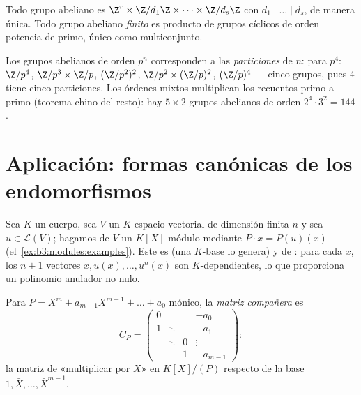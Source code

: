 \begin{corollary}
\label{cor:b3:modules:abelian}
Todo grupo abeliano 
es $\Z^r \times
\Z/d_1\Z\times\dots\times\Z/d_s\Z$ con $d_1 \mid \dots \mid
d_s$, de manera única. Todo grupo abeliano \emph{finito} es producto de
grupos cíclicos de orden potencia de primo, único como
multiconjunto.
\end{corollary}

\begin{example}\label{ex:b3:modules:abelian}
Los grupos abelianos de orden $p^n$ corresponden a las
\emph{particiones} de $n$: para $p^4$: $\Z/p^4$, $\Z/p^3\times\Z/p$,
$(\Z/p^2)^2$, $\Z/p^2 \times (\Z/p)^2$, $(\Z/p)^4$ --- cinco grupos,
pues $4$ tiene cinco particiones. Los órdenes mixtos multiplican los
recuentos primo a primo (teorema chino del resto): hay $5 \times 2$
grupos abelianos de orden $2^4 \cdot 3^2 = 144$.
\end{example}

\section{Aplicación: formas canónicas de los endomorfismos}

Sea $K$ un cuerpo, sea $V$ un $K$-espacio vectorial de dimensión finita
$n$ y sea $u \in \mathcal L(V)$; hagamos de $V$ un $K[X]$-módulo
mediante $P
\cdot x = P(u)(x)$ (el~\cref{ex:b3:modules:examples}). Este
 es
 (una $K$-base lo
genera) y de : para cada $x$,
los $n+1$ vectores $x, u(x), \dots, u^n(x)$ son $K$-dependientes, lo que
proporciona un polinomio anulador no nulo.

\begin{definition}\label{def:b3:modules:companion}
Para $P = X^m + a_{m-1}X^{m-1} + \dots + a_0$ mónico, la \emph{matriz
compañera} es
\[
C_P = \begin{pmatrix}
0 & & & -a_0\\
1 & \ddots & & -a_1\\
& \ddots & 0 & \vdots\\
& & 1 & -a_{m-1}
\end{pmatrix} :
\]
la matriz de «multiplicar por $X$» en $K[X]/(P)$ respecto de la base
$1, \bar X, \dots, \bar X^{m-1}$.
\end{definition}


